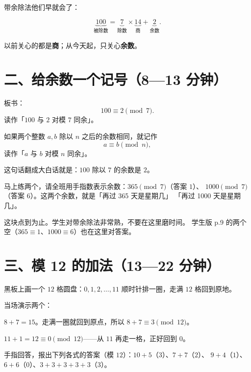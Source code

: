 带余除法他们早就会了：

\[
  \underbrace{100}_{\text{被除数}} = \underbrace{7}_{\text{除数}}\times\underbrace{14}_{\text{商}} + \underbrace{2}_{\text{余数}} .
\]

以前关心的都是\textbf{商}；从今天起，只关心\textbf{余数}。

\section*{二、给余数一个记号（8—13 分钟）}

板书：
\[
  100\equiv2 \pmod 7 .
\]
读作「\(100\) 与 \(2\) 对模 \(7\) 同余」。

\begin{definition}[同余]
  如果两个整数 \(a,b\) 除以 \(n\) 之后的余数相同，就记作
  \[
    a\equiv b \pmod n,
  \]
  读作「\(a\) 与 \(b\) 对模 \(n\) 同余」。
\end{definition}

这句话翻成大白话就是：\(100\) 除以 \(7\) 的余数是 \(2\)。

\begin{caozuo}
  马上练两个，请全班用手指数表示余数：\(365\pmod 7\)（答案 \(1\)）、
  \(1000\pmod 7\)（答案 \(6\)）。这两个余数，就是「再过 365 天是星期几」
  「再过 1000 天是星期几」。
\end{caozuo}

\begin{zhu}
  这块点到为止。学生对带余除法非常熟，不要在这里磨时间。
  学生版 p.9 的两个空（\(365\equiv1\)、\(1000\equiv6\)）也在这里对答案。
\end{zhu}

\section*{三、模 12 的加法（13—22 分钟）}

黑板上画一个 \(12\) 格圆盘：\(0,1,2,\dots,11\) 顺时针排一圈，走满 \(12\) 格回到原地。

当场演示两个：

\begin{example}
  \(8+7=15\)。走满一圈就回到原点，所以 \(8+7\equiv3\pmod{12}\)。
\end{example}

\begin{example}
  \(11+1=12\equiv0\pmod{12}\)——从 \(11\) 再走一格，正好回到 \(0\)。
\end{example}

\begin{caozuo}
  手指回答，报出下列各式的答案（模 \(12\)）：\(10+5\)（\(3\)）、\(7+7\)（\(2\)）、
  \(9+4\)（\(1\)）、\(6+6\)（\(0\)）、\(3+3+3+3+3\)（\(3\)）。
\end{caozuo}

